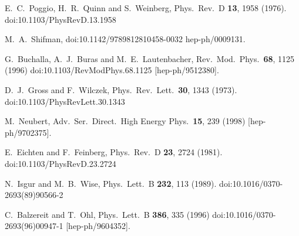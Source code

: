 \begin{thebibliography}{99}
  E.~C.~Poggio, H.~R.~Quinn and S.~Weinberg,
  Phys.\ Rev.\ D {\bf 13}, 1958 (1976).
  doi:10.1103/PhysRevD.13.1958
  
  M.~A.~Shifman,
  doi:10.1142/9789812810458-0032
  hep-ph/0009131.
  

  G.~Buchalla, A.~J.~Buras and M.~E.~Lautenbacher,
  Rev.\ Mod.\ Phys.\  {\bf 68}, 1125 (1996)
  doi:10.1103/RevModPhys.68.1125
  [hep-ph/9512380].
    
  D.~J.~Gross and F.~Wilczek,
  Phys.\ Rev.\ Lett.\  {\bf 30}, 1343 (1973).
  doi:10.1103/PhysRevLett.30.1343
  
  M.~Neubert,
  Adv.\ Ser.\ Direct.\ High Energy Phys.\  {\bf 15}, 239 (1998)
  [hep-ph/9702375].
  
  E.~Eichten and F.~Feinberg,
  Phys.\ Rev.\ D {\bf 23}, 2724 (1981).
  doi:10.1103/PhysRevD.23.2724
  
  N.~Isgur and M.~B.~Wise,
  Phys.\ Lett.\ B {\bf 232}, 113 (1989).
  doi:10.1016/0370-2693(89)90566-2
  
  C.~Balzereit and T.~Ohl,
  Phys.\ Lett.\ B {\bf 386}, 335 (1996)
  doi:10.1016/0370-2693(96)00947-1
  [hep-ph/9604352].
  

\end{thebibliography}
